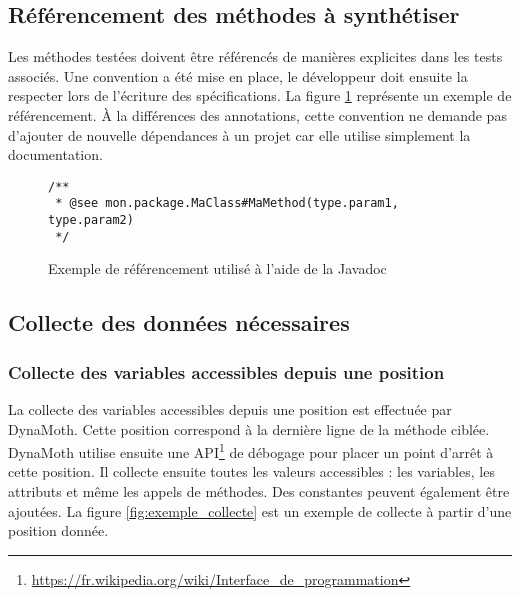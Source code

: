 \subsection{Référencement des méthodes à synthétiser}
\label{subsec:ciblage}
\par Les méthodes testées doivent être référencés de manières explicites dans les tests associés. Une convention a été mise en place, le développeur doit ensuite la respecter lors de l'écriture des spécifications. La figure \ref{fig:ciblage} représente un exemple de référencement. À la différences des annotations, cette convention ne demande pas d'ajouter de nouvelle dépendances à un projet car elle utilise simplement la documentation.

\begin{figure}[H]
\begin{lstlisting}
/**
 * @see mon.package.MaClass#MaMethod(type.param1, type.param2)
 */
\end{lstlisting}
\caption{Exemple de référencement utilisé à l'aide de la Javadoc}
\label{fig:ciblage}
\end{figure}



\subsection{Collecte des données nécessaires}

\subsubsection{Collecte des variables accessibles depuis une position}
\label{subsec:collecte_entree}
\par La collecte des variables accessibles depuis une position est effectuée par DynaMoth. Cette position correspond à la dernière ligne de la méthode ciblée. DynaMoth utilise ensuite une API\footnote{\url{https://fr.wikipedia.org/wiki/Interface_de_programmation}} de débogage pour placer un point d'arrêt à cette position. Il collecte ensuite toutes les valeurs accessibles : les variables, les attributs et même les appels de méthodes. Des constantes peuvent également être ajoutées. La figure \ref{fig:exemple_collecte} est un exemple de collecte à partir d'une position donnée.

